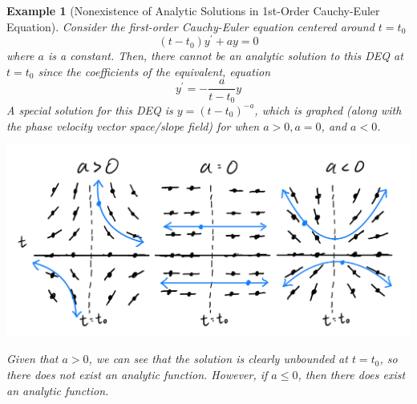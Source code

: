 \documentclass{article}
\newtheorem{example}{Example}[section]
\theoremstyle{remark}
\theoremstyle{definition}
\begin{document}
    \begin{example}[Nonexistence of Analytic Solutions in 1st-Order Cauchy-Euler Equation]
    Consider the first-order Cauchy-Euler equation centered around $t = t_0$
    \[(t - t_0) y^\prime + a y = 0\]
    where $a$ is a constant. Then, there cannot be an analytic solution to this DEQ at $t = t_0$ since the coefficients of the equivalent, equation
    \[y^\prime = -\frac{a}{t-t_0} y\]
    A special solution for this DEQ is $y = (t - t_0)^{-a}$, which is graphed (along with the phase velocity vector space/slope field) for when $a > 0, a = 0$, and $a < 0$. 
    \begin{center}
        \includegraphics[scale=0.25]{img/Singular_Point_of_1st_Cauchy_Euler.PNG}
    \end{center}
    Given that $a > 0$, we can see that the solution is clearly unbounded at $t = t_0$, so there does not exist an analytic function. However, if $a \leq 0$, then there does exist an analytic function. 
    \end{example}
\end{document}
